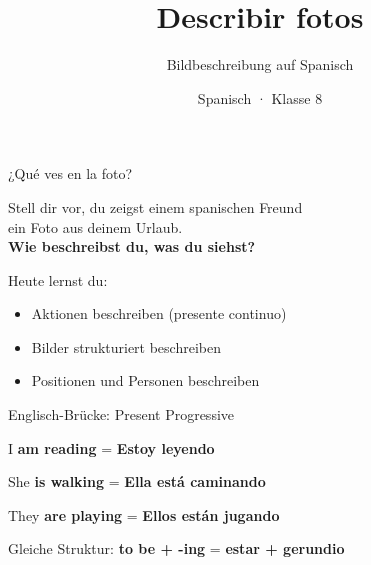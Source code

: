 \documentclass[aspectratio=169, 14pt]{beamer}
\title{Describir fotos}
\subtitle{Bildbeschreibung auf Spanisch}
\author{Spanisch · Klasse 8}
\date{}
\newcommand{\es}[1]{\textbf{#1}}
\begin{document}
\begin{frame}
    \titlepage
\end{frame}

\begin{frame}{¿Qué ves en la foto?}

\begin{center}
    \Large
    Stell dir vor, du zeigst einem spanischen Freund\\
    ein Foto aus deinem Urlaub.\\[1em]

    \textbf{Wie beschreibst du, was du siehst?}
\end{center}

\vspace{1em}

\begin{block}{Heute lernst du:}
\begin{itemize}
    \item Aktionen beschreiben (presente continuo)
    \item Bilder strukturiert beschreiben
    \item Positionen und Personen beschreiben
\end{itemize}
\end{block}

\end{frame}

\begin{frame}{Englisch-Brücke: Present Progressive}

\begin{center}
\Large

\textcolor{akzent}{I \textbf{am reading}} = \textcolor{spanisch}{\es{Estoy leyendo}}

\vspace{1.5em}

\textcolor{akzent}{She \textbf{is walking}} = \textcolor{spanisch}{\es{Ella está caminando}}

\vspace{1.5em}

\textcolor{akzent}{They \textbf{are playing}} = \textcolor{spanisch}{\es{Ellos están jugando}}

\end{center}

\vspace{1em}

\begin{block}{}
\centering
Gleiche Struktur: \textbf{to be + -ing} = \textbf{estar + gerundio}
\end{block}

\end{frame}
\end{document}
